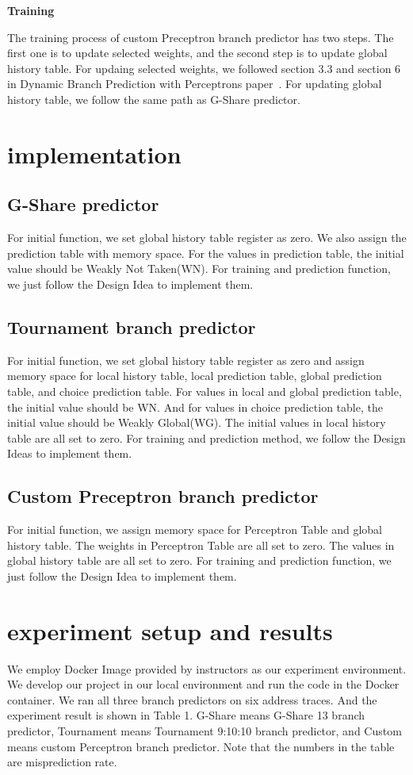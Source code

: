 \documentclass[conference]{IEEEtran}
\begin{document}
\begin{center}
  \textbf{Training}
\end{center}
The training process of custom Preceptron branch predictor has two steps. The first one is to update selected weights, and the second step is to update global history table. For updaing selected weights, we followed section 3.3 and section 6 in Dynamic Branch Prediction with Perceptrons paper~\cite{nicepaper4}. 
For updating global history table, we follow the same path as G-Share predictor. 

\section{implementation}
\subsection{G-Share predictor}
For initial function, we set global history table register as zero. We also assign the prediction table with memory space. For the values in prediction table, the initial value should be Weakly Not Taken(WN). For training and prediction function, we just follow the Design Idea to implement them. 
\subsection{Tournament branch predictor}
For initial function, we set global history table register as zero and assign memory space for local history table, local prediction table, global prediction table, and choice prediction table.
For values in local and global prediction table, the initial value should be WN. And for values in choice prediction table, the initial value should be Weakly Global(WG). The initial values in local history table
 are all set to zero. For training and prediction method, we follow the Design Ideas to implement them. 
\subsection{Custom Preceptron branch predictor}
For initial function, we assign memory space for Perceptron Table and global history table. The weights in Perceptron Table are all set to zero. The values in global history table are all set to zero. For training and prediction function, we just follow the Design Idea to implement them.
\section{experiment setup and results}
We employ Docker Image provided by instructors as our experiment environment. We develop our project in our local environment and run the code in the Docker container. We ran all three branch predictors on six address traces. And
the experiment result is shown in Table 1. G-Share means G-Share 13 branch predictor, Tournament means Tournament 9:10:10 branch predictor, and Custom means custom Perceptron branch predictor. 
Note that the numbers in the table are misprediction rate. 
\end{document}
